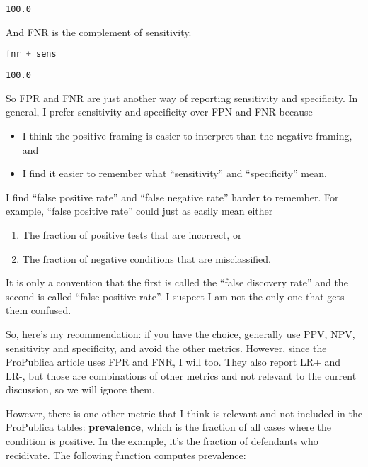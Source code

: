 \begin{lstlisting}[style=output]
100.0
\end{lstlisting}

And FNR is the complement of sensitivity.

\begin{lstlisting}[language=Python,style=source]
fnr + sens
\end{lstlisting}

\begin{lstlisting}[style=output]
100.0
\end{lstlisting}

So FPR and FNR are just another way of reporting sensitivity and
specificity. In general, I prefer sensitivity and specificity over FPN
and FNR because

\begin{itemize}
\item
  I think the positive framing is easier to interpret than the negative
  framing, and
\item
  I find it easier to remember what ``sensitivity'' and ``specificity''
  mean.
\end{itemize}

I find ``false positive rate'' and ``false negative rate'' harder to
remember. For example, ``false positive rate'' could just as easily mean
either

\begin{enumerate}
\def\labelenumi{\arabic{enumi}.}
\item
  The fraction of positive tests that are incorrect, or
\item
  The fraction of negative conditions that are misclassified.
\end{enumerate}

It is only a convention that the first is called the ``false discovery
rate'' and the second is called ``false positive rate''. I suspect I am
not the only one that gets them confused.

So, here's my recommendation: if you have the choice, generally use PPV,
NPV, sensitivity and specificity, and avoid the other metrics. However,
since the ProPublica article uses FPR and FNR, I will too. They also
report LR+ and LR-, but those are combinations of other metrics and not
relevant to the current discussion, so we will ignore them.

However, there is one other metric that I think is relevant and not
included in the ProPublica tables: \textbf{prevalence}, which is the
fraction of all cases where the condition is positive. In the example,
it's the fraction of defendants who recidivate. The following function
computes prevalence:

